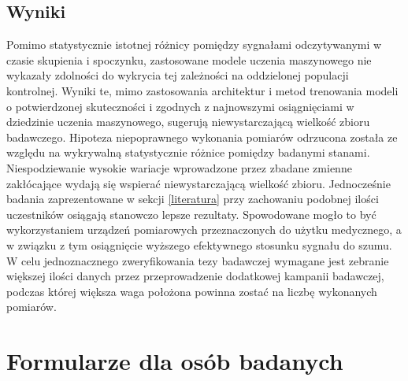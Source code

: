 \documentclass{./assets/wfis}
\begin{document}



\section{Wyniki}\label{dyskusja}
Pomimo statystycznie istotnej różnicy pomiędzy sygnałami odczytywanymi w czasie skupienia i spoczynku, zastosowane modele uczenia maszynowego nie wykazały zdolności do wykrycia tej zależności na oddzielonej populacji kontrolnej. Wyniki te, mimo zastosowania architektur i metod trenowania modeli o potwierdzonej skuteczności i zgodnych z najnowszymi osiągnięciami w dziedzinie uczenia maszynowego, sugerują niewystarczającą wielkość zbioru badawczego. Hipoteza niepoprawnego wykonania pomiarów odrzucona została ze względu na wykrywalną statystycznie różnice pomiędzy badanymi stanami. Niespodziewanie wysokie wariacje wprowadzone przez zbadane zmienne zakłócające wydają się wspierać niewystarczającą wielkość zbioru. Jednocześnie badania zaprezentowane w sekcji \ref{literatura} przy zachowaniu podobnej ilości uczestników osiągają stanowczo lepsze rezultaty. Spowodowane mogło to być wykorzystaniem urządzeń pomiarowych przeznaczonych do użytku medycznego, a w związku z tym osiągnięcie wyższego efektywnego stosunku sygnału do szumu. W celu jednoznacznego zweryfikowania tezy badawczej wymagane jest zebranie większej ilości danych przez przeprowadzenie dodatkowej kampanii badawczej, podczas której większa waga położona powinna zostać na liczbę wykonanych pomiarów.

\printbibliography

\clearpage
\listoffigures
\clearpage
\listoftables
\clearpage
\lstlistoflisting
\clearpage

\appendix
\chapter{Formularze dla osób badanych}\label{formularz-dla-osoby-badanej}
\end{document}
